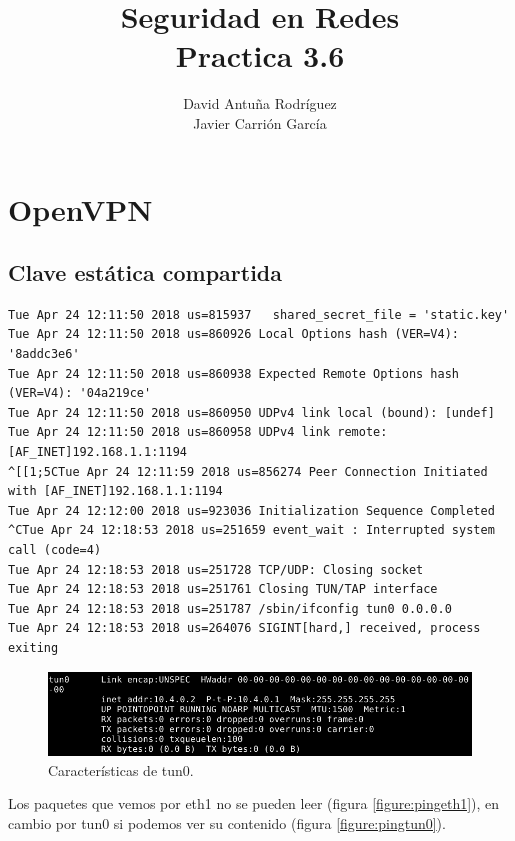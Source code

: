 \documentclass[11pt]{article}
\title{\Large Seguridad en Redes\\Practica 3.6}
\author{David Antuña Rodríguez\\Javier Carrión García}
\date{}
\begin{document}
  \raggedright

  \maketitle
  \newpage

  \section{OpenVPN}
    \subsection{Clave estática compartida}
      \lstset{basicstyle=\ttfamily\small}
\begin{lstlisting}
Tue Apr 24 12:11:50 2018 us=815937   shared_secret_file = 'static.key'
Tue Apr 24 12:11:50 2018 us=860926 Local Options hash (VER=V4): '8addc3e6'
Tue Apr 24 12:11:50 2018 us=860938 Expected Remote Options hash (VER=V4): '04a219ce'
Tue Apr 24 12:11:50 2018 us=860950 UDPv4 link local (bound): [undef]
Tue Apr 24 12:11:50 2018 us=860958 UDPv4 link remote: [AF_INET]192.168.1.1:1194
^[[1;5CTue Apr 24 12:11:59 2018 us=856274 Peer Connection Initiated with [AF_INET]192.168.1.1:1194
Tue Apr 24 12:12:00 2018 us=923036 Initialization Sequence Completed
^CTue Apr 24 12:18:53 2018 us=251659 event_wait : Interrupted system call (code=4)
Tue Apr 24 12:18:53 2018 us=251728 TCP/UDP: Closing socket
Tue Apr 24 12:18:53 2018 us=251761 Closing TUN/TAP interface
Tue Apr 24 12:18:53 2018 us=251787 /sbin/ifconfig tun0 0.0.0.0
Tue Apr 24 12:18:53 2018 us=264076 SIGINT[hard,] received, process exiting
\end{lstlisting}

      \begin{figure}[H]
        \centering
        \includegraphics[width = \textwidth]{tun0}
        \caption{Características de tun0.}
      \end{figure}

      \par
      Los paquetes que vemos por eth1 no se pueden leer (figura
      \ref{figure:pingeth1}), en cambio por tun0 si podemos ver su contenido
      (figura \ref{figure:pingtun0}).
\end{document}
